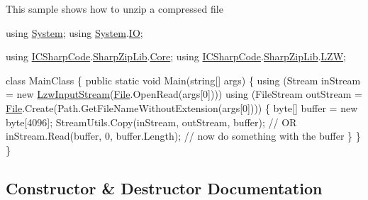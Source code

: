 This sample shows how to unzip a compressed file 
\begin{DoxyCode}
\textcolor{keyword}{using} \hyperlink{namespace_system}{System};
\textcolor{keyword}{using} \hyperlink{namespace_system}{System}.\hyperlink{namespace_system_1_1_i_o}{IO};

\textcolor{keyword}{using} \hyperlink{namespace_i_c_sharp_code}{ICSharpCode}.\hyperlink{namespace_i_c_sharp_code_1_1_sharp_zip_lib}{SharpZipLib}.\hyperlink{namespace_i_c_sharp_code_1_1_sharp_zip_lib_1_1_core}{Core};
\textcolor{keyword}{using} \hyperlink{namespace_i_c_sharp_code}{ICSharpCode}.\hyperlink{namespace_i_c_sharp_code_1_1_sharp_zip_lib}{SharpZipLib}.\hyperlink{namespace_i_c_sharp_code_1_1_sharp_zip_lib_1_1_l_z_w}{LZW};

\textcolor{keyword}{class }MainClass
\{
    \textcolor{keyword}{public} \textcolor{keyword}{static} \textcolor{keywordtype}{void} Main(\textcolor{keywordtype}{string}[] args)
    \{
        \textcolor{keyword}{using} (Stream inStream = \textcolor{keyword}{new} \hyperlink{class_i_c_sharp_code_1_1_sharp_zip_lib_1_1_l_z_w_1_1_lzw_input_stream_a0b2d345fb6423874386e68cf1e13eb93}{LzwInputStream}(\hyperlink{namespace_lerp2_a_p_i_1_1_utility_af5d628470963cc0f18c37055b4170bf1a0b27918290ff5323bea1e3b78a9cf04e}{File}.OpenRead(args[0])))
        \textcolor{keyword}{using} (FileStream outStream = \hyperlink{namespace_lerp2_a_p_i_1_1_utility_af5d628470963cc0f18c37055b4170bf1a0b27918290ff5323bea1e3b78a9cf04e}{File}.Create(Path.GetFileNameWithoutExtension(args[0]))) \{
            byte[] buffer = \textcolor{keyword}{new} byte[4096];
            StreamUtils.Copy(inStream, outStream, buffer);
                        \textcolor{comment}{// OR}
                        inStream.Read(buffer, 0, buffer.Length);
                        \textcolor{comment}{// now do something with the buffer}
        \}
    \}
\}   
\end{DoxyCode}
 

\subsection{Constructor \& Destructor Documentation}
\mbox{\label{class_i_c_sharp_code_1_1_sharp_zip_lib_1_1_l_z_w_1_1_lzw_input_stream_a0b2d345fb6423874386e68cf1e13eb93}} 
